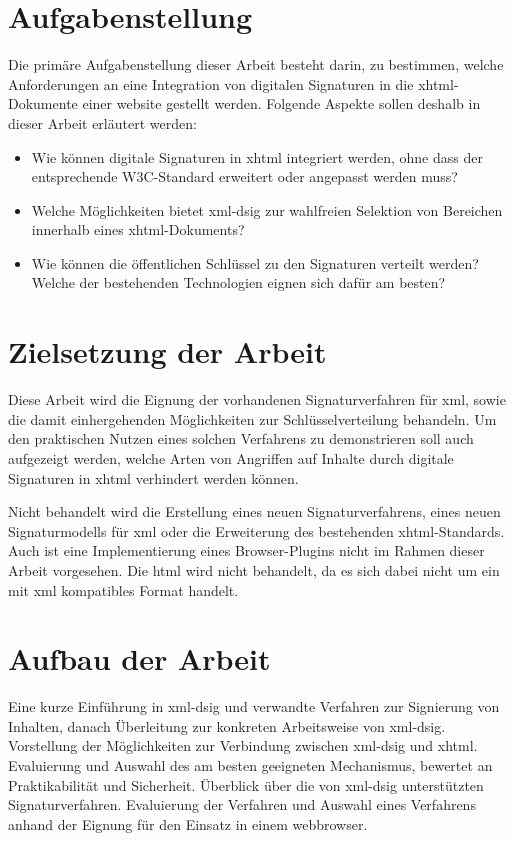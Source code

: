 \section{Aufgabenstellung}
\label{sec:Einleitung:aufgabenstellung}
Die primäre Aufgabenstellung dieser Arbeit besteht darin, zu bestimmen, welche Anforderungen an eine Integration von digitalen Signaturen in die
\gls{xhtml}-Dokumente einer \gls{website} gestellt werden. Folgende Aspekte sollen deshalb in dieser Arbeit erläutert werden:
\begin{itemize}
    \item Wie können digitale Signaturen in \gls{xhtml} integriert werden, ohne dass der entsprechende W3C-Standard \cite{xhtml:w3c} erweitert oder angepasst
    werden muss?
    \item Welche Möglichkeiten bietet \gls{xml-dsig} zur wahlfreien Selektion von Bereichen innerhalb eines \gls{xhtml}-Dokuments?
    \item Wie können die öffentlichen Schlüssel zu den Signaturen verteilt werden? Welche der bestehenden Technologien eignen sich dafür am besten?
\end{itemize}

\section{Zielsetzung der Arbeit}
\label{sec:Einleitung:ziele}
Diese Arbeit wird die Eignung der vorhandenen Signaturverfahren für \gls{xml}, sowie die damit einhergehenden Möglichkeiten zur Schlüsselverteilung
behandeln. Um den praktischen Nutzen eines solchen Verfahrens zu demonstrieren soll auch aufgezeigt werden, welche Arten von Angriffen auf Inhalte durch
digitale Signaturen in \gls{xhtml} verhindert werden können.

Nicht behandelt wird die Erstellung eines neuen Signaturverfahrens, eines neuen Signaturmodells für \gls{xml} oder die Erweiterung des bestehenden
\gls{xhtml}-Standards. Auch ist eine Implementierung eines Browser-Plugins nicht im Rahmen dieser Arbeit vorgesehen. Die \gls{html} wird nicht behandelt, da es
sich dabei nicht um ein mit \gls{xml} kompatibles Format handelt.


\section{Aufbau der Arbeit}
\label{sec:Einleitung:aufbau}
Eine kurze Einführung in \gls{xml-dsig} und verwandte Verfahren zur Signierung von Inhalten, danach Überleitung zur konkreten Arbeitsweise von \gls{xml-dsig}.
Vorstellung der Möglichkeiten zur Verbindung zwischen \gls{xml-dsig} und \gls{xhtml}. Evaluierung und Auswahl des am besten geeigneten Mechanismus, bewertet an
Praktikabilität und Sicherheit. Überblick über die von \gls{xml-dsig} unterstützten Signaturverfahren. Evaluierung der Verfahren und Auswahl eines Verfahrens
anhand der Eignung für den Einsatz in einem \gls{webbrowser}.

